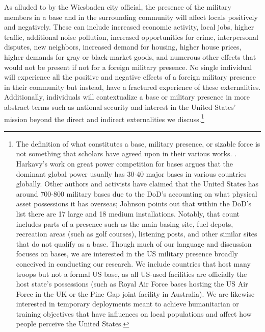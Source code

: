 As alluded to by the Wiesbaden city official, the presence of the military members in a base and in the surrounding community will affect locals positively and negatively. These can include increased economic activity, local jobs, higher traffic, additional noise pollution, increased opportunities for crime, interpersonal disputes, new neighbors, increased demand for housing, higher house prices, higher demands for gray or black-market goods, and numerous other effects that would not be present if not for a foreign military presence. No single individual will experience all the positive and negative effects of a foreign military presence in their community but instead, have a fractured experience of these externalities. Additionally, individuals will contextualize a base or military presence in more abstract terms such as national security and interest in the United States' mission beyond the direct and indirect externalities we discuss.\footnote{The definition of what constitutes a base, military presence, or sizable force is not something that scholars have agreed upon in their various works. \autocite[See:][]{Gillem2007}. Harkavy's work on great power competition for bases argues that the dominant global power usually has 30-40 major bases in various countries globally. \autocite[See:][]{Harkavy1989} Other authors and activists have claimed that the United States has around 700-800 military bases due to the DoD's accounting on what physical asset possessions it has overseas; Johnson points out that within the DoD's list there are 17 large and 18 medium installations. \autocite[See:][]{Johnson2004} Notably, that count includes parts of a presence such as the main basing site, fuel depots, recreation areas (such as golf courses), listening posts, and other similar sites that do not qualify as a base. Though much of our language and discussion focuses on bases, we are interested in the US military presence broadly conceived in conducting our research. We include countries that host many troops but not a formal US base, as all US-used facilities are officially the host state's possessions (such as Royal Air Force bases hosting the US Air Force in the UK or the Pine Gap joint facility in Australia). We are likewise interested in temporary deployments meant to achieve humanitarian or training objectives that have influences on local populations and affect how people perceive the United States.} 

